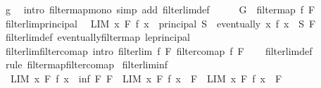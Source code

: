 \begin{isabellebody}
\ g\ \isamarkupfalse%
\ {\isacharparenleft}{\kern0pt}intro\ filtermap{\isacharunderscore}{\kern0pt}mono{\isacharparenright}{\kern0pt}\ {\isacharparenleft}{\kern0pt}simp\ add{\isacharcolon}{\kern0pt}\ filterlim{\isacharunderscore}{\kern0pt}def{\isacharparenright}{\kern0pt}\isanewline
\ \ \isamarkupfalse%
\ \isamarkupfalse%
\ {\isachardoublequoteopen}G\ {\isasymle}\ filtermap\ f\ F{\isachardoublequoteclose}\ \isacommand{{\isachardot}{\kern0pt}}\isamarkupfalse%
\isanewline
{}\isamarkupfalse%
%
\endisatagproof
{\isafoldproof}%
%
\isadelimproof
\isanewline
%
\endisadelimproof
\isanewline
{}\isamarkupfalse%
\ filterlim{\isacharunderscore}{\kern0pt}principal{\isacharcolon}{\kern0pt}\isanewline
\ \ {\isachardoublequoteopen}{\isacharparenleft}{\kern0pt}LIM\ x\ F{\isachardot}{\kern0pt}\ f\ x\ {\isacharcolon}{\kern0pt}{\isachargreater}{\kern0pt}\ principal\ S{\isacharparenright}{\kern0pt}\ {\isasymlongleftrightarrow}\ {\isacharparenleft}{\kern0pt}eventually\ {\isacharparenleft}{\kern0pt}{\isasymlambda}x{\isachardot}{\kern0pt}\ f\ x\ {\isasymin}\ S{\isacharparenright}{\kern0pt}\ F{\isacharparenright}{\kern0pt}{\isachardoublequoteclose}\isanewline
%
\isadelimproof
\ \ %
\endisadelimproof
%
\isatagproof
{}\isamarkupfalse%
\ filterlim{\isacharunderscore}{\kern0pt}def\ eventually{\isacharunderscore}{\kern0pt}filtermap\ le{\isacharunderscore}{\kern0pt}principal\ \isacommand{{\isachardot}{\kern0pt}{\isachardot}{\kern0pt}}\isamarkupfalse%
%
\endisatagproof
{\isafoldproof}%
%
\isadelimproof
\isanewline
%
\endisadelimproof
\isanewline
{}\isamarkupfalse%
\ filterlim{\isacharunderscore}{\kern0pt}filtercomap\ {\isacharbrackleft}{\kern0pt}intro{\isacharbrackright}{\kern0pt}{\isacharcolon}{\kern0pt}\ {\isachardoublequoteopen}filterlim\ f\ F\ {\isacharparenleft}{\kern0pt}filtercomap\ f\ F{\isacharparenright}{\kern0pt}{\isachardoublequoteclose}\isanewline
%
\isadelimproof
\ \ %
\endisadelimproof
%
\isatagproof
{}\isamarkupfalse%
\ filterlim{\isacharunderscore}{\kern0pt}def\ \isamarkupfalse%
\ {\isacharparenleft}{\kern0pt}rule\ filtermap{\isacharunderscore}{\kern0pt}filtercomap{\isacharparenright}{\kern0pt}%
\endisatagproof
{\isafoldproof}%
%
\isadelimproof
\isanewline
%
\endisadelimproof
\isanewline
{}\isamarkupfalse%
\ filterlim{\isacharunderscore}{\kern0pt}inf{\isacharcolon}{\kern0pt}\isanewline
\ \ {\isachardoublequoteopen}{\isacharparenleft}{\kern0pt}LIM\ x\ F{}{\isachardot}{\kern0pt}\ f\ x\ {\isacharcolon}{\kern0pt}{\isachargreater}{\kern0pt}\ inf\ F{}\ F{}{\isacharparenright}{\kern0pt}\ {\isasymlongleftrightarrow}\ {\isacharparenleft}{\kern0pt}{\isacharparenleft}{\kern0pt}LIM\ x\ F{}{\isachardot}{\kern0pt}\ f\ x\ {\isacharcolon}{\kern0pt}{\isachargreater}{\kern0pt}\ F{}{\isacharparenright}{\kern0pt}\ {\isasymand}\ {\isacharparenleft}{\kern0pt}LIM\ x\ F{}{\isachardot}{\kern0pt}\ f\ x\ {\isacharcolon}{\kern0pt}{\isachargreater}{\kern0pt}\ F{}{\isacharparenright}{\kern0pt}{\isacharparenright}{\kern0pt}{\isachardoublequoteclose}\isanewline

\end{isabellebody}
